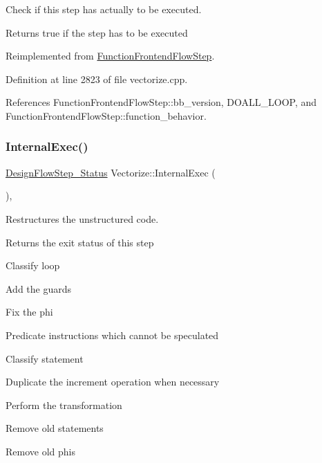 Check if this step has actually to be executed. 

\begin{DoxyReturn}{Returns}
true if the step has to be executed 
\end{DoxyReturn}


Reimplemented from \hyperlink{classFunctionFrontendFlowStep_a12e786363530aa9533e4bd9380130d75}{Function\+Frontend\+Flow\+Step}.



Definition at line 2823 of file vectorize.\+cpp.



References Function\+Frontend\+Flow\+Step\+::bb\+\_\+version, D\+O\+A\+L\+L\+\_\+\+L\+O\+OP, and Function\+Frontend\+Flow\+Step\+::function\+\_\+behavior.

\mbox{\label{classVectorize_aecc4f293d0b0f625f26005582886ca48}} 
\subsubsection{\texorpdfstring{Internal\+Exec()}{InternalExec()}}
{\footnotesize\ttfamily \hyperlink{design__flow__step_8hpp_afb1f0d73069c26076b8d31dbc8ebecdf}{Design\+Flow\+Step\+\_\+\+Status} Vectorize\+::\+Internal\+Exec (\begin{DoxyParamCaption}{ }\end{DoxyParamCaption})\hspace{0.3cm}{\ttfamily [override]}, {\ttfamily [virtual]}}



Restructures the unstructured code. 

\begin{DoxyReturn}{Returns}
the exit status of this step 
\end{DoxyReturn}
Classify loop

Add the guards

Fix the phi

Predicate instructions which cannot be speculated

Classify statement

Duplicate the increment operation when necessary

Perform the transformation

Remove old statements

Remove old phis

